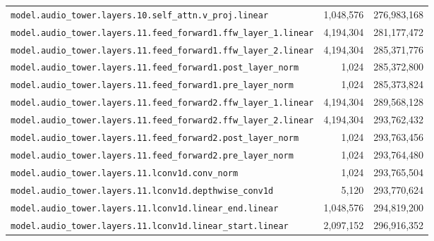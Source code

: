 \documentclass[10pt,a4paper]{article}
\theoremstyle{definition}
\begin{document}
\begin{appendices}
\begin{longtable}{p{9.5cm}rr}
\texttt{model.\allowbreak{}audio\_tower.\allowbreak{}layers.\allowbreak{}10.\allowbreak{}self\_attn.\allowbreak{}v\_proj.\allowbreak{}linear} & 1,048,576 & 276,983,168 \\
\texttt{model.\allowbreak{}audio\_tower.\allowbreak{}layers.\allowbreak{}11.\allowbreak{}feed\_forward1.\allowbreak{}ffw\_layer\_1.\allowbreak{}linear} & 4,194,304 & 281,177,472 \\
\texttt{model.\allowbreak{}audio\_tower.\allowbreak{}layers.\allowbreak{}11.\allowbreak{}feed\_forward1.\allowbreak{}ffw\_layer\_2.\allowbreak{}linear} & 4,194,304 & 285,371,776 \\
\texttt{model.\allowbreak{}audio\_tower.\allowbreak{}layers.\allowbreak{}11.\allowbreak{}feed\_forward1.\allowbreak{}post\_layer\_norm} & 1,024 & 285,372,800 \\
\texttt{model.\allowbreak{}audio\_tower.\allowbreak{}layers.\allowbreak{}11.\allowbreak{}feed\_forward1.\allowbreak{}pre\_layer\_norm} & 1,024 & 285,373,824 \\
\texttt{model.\allowbreak{}audio\_tower.\allowbreak{}layers.\allowbreak{}11.\allowbreak{}feed\_forward2.\allowbreak{}ffw\_layer\_1.\allowbreak{}linear} & 4,194,304 & 289,568,128 \\
\texttt{model.\allowbreak{}audio\_tower.\allowbreak{}layers.\allowbreak{}11.\allowbreak{}feed\_forward2.\allowbreak{}ffw\_layer\_2.\allowbreak{}linear} & 4,194,304 & 293,762,432 \\
\texttt{model.\allowbreak{}audio\_tower.\allowbreak{}layers.\allowbreak{}11.\allowbreak{}feed\_forward2.\allowbreak{}post\_layer\_norm} & 1,024 & 293,763,456 \\
\texttt{model.\allowbreak{}audio\_tower.\allowbreak{}layers.\allowbreak{}11.\allowbreak{}feed\_forward2.\allowbreak{}pre\_layer\_norm} & 1,024 & 293,764,480 \\
\texttt{model.\allowbreak{}audio\_tower.\allowbreak{}layers.\allowbreak{}11.\allowbreak{}lconv1d.\allowbreak{}conv\_norm} & 1,024 & 293,765,504 \\
\texttt{model.\allowbreak{}audio\_tower.\allowbreak{}layers.\allowbreak{}11.\allowbreak{}lconv1d.\allowbreak{}depthwise\_conv1d} & 5,120 & 293,770,624 \\
\texttt{model.\allowbreak{}audio\_tower.\allowbreak{}layers.\allowbreak{}11.\allowbreak{}lconv1d.\allowbreak{}linear\_end.\allowbreak{}linear} & 1,048,576 & 294,819,200 \\
\texttt{model.\allowbreak{}audio\_tower.\allowbreak{}layers.\allowbreak{}11.\allowbreak{}lconv1d.\allowbreak{}linear\_start.\allowbreak{}linear} & 2,097,152 & 296,916,352 \\

\end{longtable}
\end{appendices}
\end{document}
